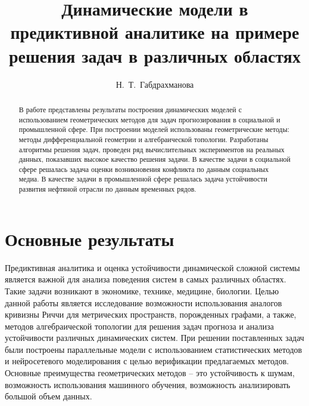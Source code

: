 \usepackage{todonotes}

\usepackage[russian]{nla}


\fi

\title{Динамические модели в предиктивной аналитике на примере решения задач в различных областях}
\author{Н.~Т.~Габдрахманова
}

\institute{РУДН им. Патриса Лумумбы, Москва, Россия \\
 \email{gabdrakhmanova-nt@rudn.ru}
}

\maketitle

\begin{abstract}
В работе представлены результаты построения динамических моделей с использованием геометрических методов для задач прогнозирования в социальной и промышленной сфере. При построении моделей использованы геометрические методы: методы дифференциальной геометрии и алгебраической топологии. Разработаны алгоритмы решения задач, проведен ряд вычислительных экспериментов на реальных данных, показавших высокое качество решения задачи. В качестве задачи в социальной сфере решалась задача оценки возникновения конфликта по данным социальных медиа. В качестве задачи в промышленной сфере решалась задача устойчивости развития нефтяной отрасли по данным временных рядов.

\end{abstract}

\section{Основные результаты} %

Предиктивная аналитика и оценка устойчивости динамической сложной системы является важной для анализа поведения систем в самых различных областях. Такие задачи возникают в экономике, технике, медицине, биологии. Целью данной работы является исследование возможности использования аналогов кривизны Риччи для метрических пространств, порожденных графами, а также, методов алгебраической топологии для решения задач прогноза и анализа устойчивости различных динамических систем. При решении поставленных задач были построены параллельные модели с использованием статистических методов и нейросетевого моделирования с целью верификации предлагаемых методов. Основные преимущества геометрических методов 
-- это устойчивость к шумам, возможность использования машинного обучения, возможность анализировать большой объем данных.

